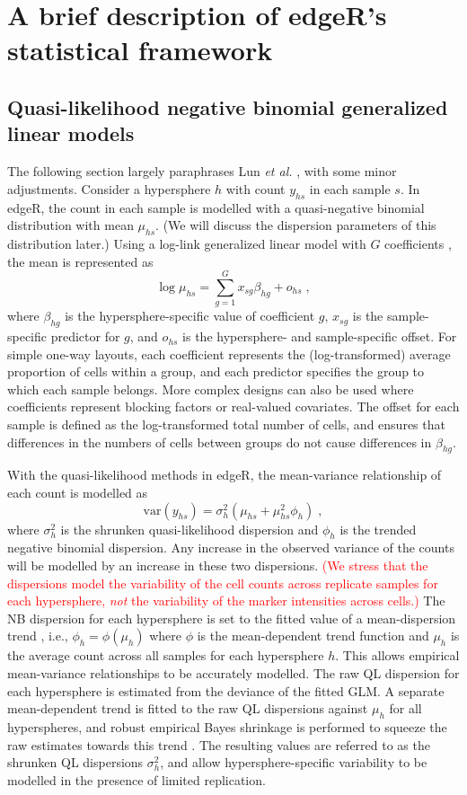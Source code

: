 \documentclass{article}
\newcommand\revised[1]{\textcolor{red}{#1}}
\begin{document}
\section{A brief description of edgeR's statistical framework}

\subsection{Quasi-likelihood negative binomial generalized linear models}
The following section largely paraphrases Lun \textit{et al.} \cite{lun2016delicious}, with some minor adjustments.
Consider a hypersphere $h$ with count $y_{hs}$ in each sample $s$.
In edgeR, the count in each sample is modelled with a quasi-negative binomial distribution with mean $\mu_{hs}$.
(We will discuss the dispersion parameters of this distribution later.)
Using a log-link generalized linear model with $G$ coefficients \cite{mccarthy2012differential}, the mean is represented as
\[
    \log \mu_{hs} = \sum_{g=1}^G x_{sg} \beta_{hg} + o_{hs} \;,
\]
where $\beta_{hg}$ is the hypersphere-specific value of coefficient $g$, $x_{sg}$ is the sample-specific predictor for $g$, and $o_{hs}$ is the hypersphere- and sample-specific offset.
For simple one-way layouts, each coefficient represents the (log-transformed) average proportion of cells within a group, and each predictor specifies the group to which each sample belongs.
More complex designs can also be used where coefficients represent blocking factors or real-valued covariates.
The offset for each sample is defined as the log-transformed total number of cells, and ensures that differences in the numbers of cells between groups do not cause differences in $\beta_{hg}$.

With the quasi-likelihood methods in edgeR, the mean-variance relationship of each count is modelled as
\[
    \mbox{var}(y_{hs}) = \sigma^2_{h} (\mu_{hs} + \mu_{hs}^2 \phi_h) \;,
\]
where $\sigma^2_h$ is the shrunken quasi-likelihood dispersion and $\phi_h$ is the trended negative binomial dispersion.
Any increase in the observed variance of the counts will be modelled by an increase in these two dispersions.
\revised{(We stress that the dispersions model the variability of the cell counts across replicate samples for each hypersphere, \textit{not} the variability of the marker intensities across cells.)}
The NB dispersion for each hypersphere is set to the fitted value of a mean-dispersion trend \cite{mccarthy2012differential}, i.e., $\phi_h = \phi(\mu_h)$ where $\phi$ is the mean-dependent trend function and $\mu_h$ is the average count across all samples for each hypersphere $h$.
This allows empirical mean-variance relationships to be accurately modelled.
The raw QL dispersion for each hypersphere is estimated from the deviance of the fitted GLM.
A separate mean-dependent trend is fitted to the raw QL dispersions against $\mu_h$ for all hyperspheres, and robust empirical Bayes shrinkage is performed to squeeze the raw estimates towards this trend \cite{lund2012detecting,phipson2016robust}.
The resulting values are referred to as the shrunken QL dispersions $\sigma^2_h$, and allow hypersphere-specific variability to be modelled in the presence of limited replication.
\end{document}
